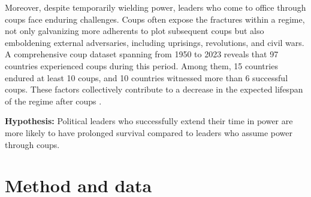 \documentclass[
  12pt,
  a4paper,
  12pt]{article}
\begin{document}
Moreover, despite temporarily wielding power, leaders who come to office
through coups face enduring challenges. Coups often expose the fractures
within a regime, not only galvanizing more adherents to plot subsequent
coups but also emboldening external adversaries, including uprisings,
revolutions, and civil wars. A comprehensive coup dataset
\citep{powell2011} spanning from 1950 to 2023 reveals that 97 countries
experienced coups during this period. Among them, 15 countries endured
at least 10 coups, and 10 countries witnessed more than 6 successful
coups. These factors collectively contribute to a decrease in the
expected lifespan of the regime after coups \citep{dahl2023}.

\textbf{Hypothesis:} Political leaders who successfully extend their
time in power are more likely to have prolonged survival compared to
leaders who assume power through coups.

\hypertarget{method-and-data}{%
\section{Method and data}\label{method-and-data}}

\newpage


\renewcommand\refname{References}
  
\end{document}
